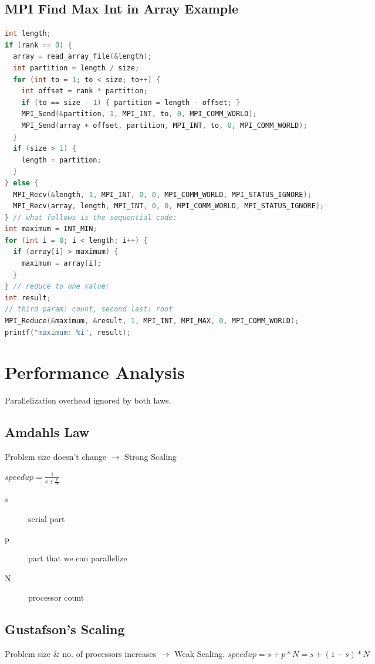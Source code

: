 \begin{multicols*}{4}
    \subsection{MPI Find Max Int in Array Example}
    \begin{lstlisting}[language=c]
int length;
if (rank == 0) {
  array = read_array_file(&length);
  int partition = length / size;
  for (int to = 1; to < size; to++) {
    int offset = rank * partition;
    if (to == size - 1) { partition = length - offset; }
    MPI_Send(&partition, 1, MPI_INT, to, 0, MPI_COMM_WORLD);
    MPI_Send(array + offset, partition, MPI_INT, to, 0, MPI_COMM_WORLD);
  }
  if (size > 1) {
    length = partition;
  }
} else {
  MPI_Recv(&length, 1, MPI_INT, 0, 0, MPI_COMM_WORLD, MPI_STATUS_IGNORE);
  MPI_Recv(array, length, MPI_INT, 0, 0, MPI_COMM_WORLD, MPI_STATUS_IGNORE);
} // what follows is the sequential code:
int maximum = INT_MIN;
for (int i = 0; i < length; i++) {
  if (array[i] > maximum) {
    maximum = array[i];
  }
} // reduce to one value:
int result;
// third param: count, second last: root
MPI_Reduce(&maximum, &result, 1, MPI_INT, MPI_MAX, 0, MPI_COMM_WORLD);
printf("maximum: %i", result);
\end{lstlisting}%

\section{Performance Analysis}
Parallelization overhead ignored by both laws.
\subsection{Amdahls Law}
Problem size doesn't change
$\rightarrow$ Strong Scaling

\begin{minipage}{0.08\textwidth}
    \(speed up = \frac{1}{s + \frac{p}{N}}\)
\end{minipage}
\begin{minipage}{0.9\textwidth}
    \begin{description}
        \item[s] serial part
        \item[p] part that we can parallelize
        \item[N] processor count
    \end{description}
\end{minipage}

\subsection{Gustafson's Scaling}
Problem size \& no. of processors increases
$\rightarrow$ Weak Scaling.
\(speed up = s + p * N = s + (1-s) * N \)


\end{multicols*}
